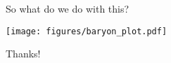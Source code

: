 \documentclass[14pt]{beamer}
\begin{document}
\begin{frame}{So what do we do with this?}

  \begin{center}
    \hspace*{-2em}
    \texttt{[image: figures/baryon\_plot.pdf]}
  \end{center}

\end{frame}

\begin{frame}[plain]
  \begin{center}
    {\changefontsize{36pt}\color{Tropiteal}Thanks!}
  \end{center}
\end{frame}
\end{document}
